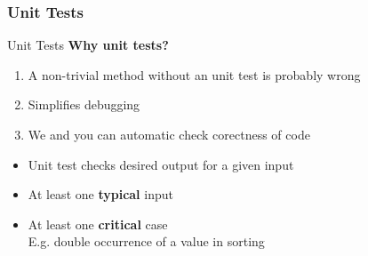 \subsubsection{Unit Tests}
\begin{frame}{Unit Tests}
  \textbf{Why unit tests?}
  \begin{enumerate}
    \item
      A non-trivial method without an unit test is probably wrong
    \item<2- |handout:1>
      Simplifies debugging
    \item<3- |handout:1>
      We and you can automatic check corectness of code
  \end{enumerate}
  \vspace{1em}
  \begin{itemize}
    \item<5- |handout:1>
      Unit test checks desired output for a given input
    \item<6- |handout:1>
      At least one \textbf{typical} input
    \item<7- |handout:1>
      At least one \textbf{critical} case\\
      {\color{Hint}E.g. double occurrence of a value in sorting}
  \end{itemize}
\end{frame}




